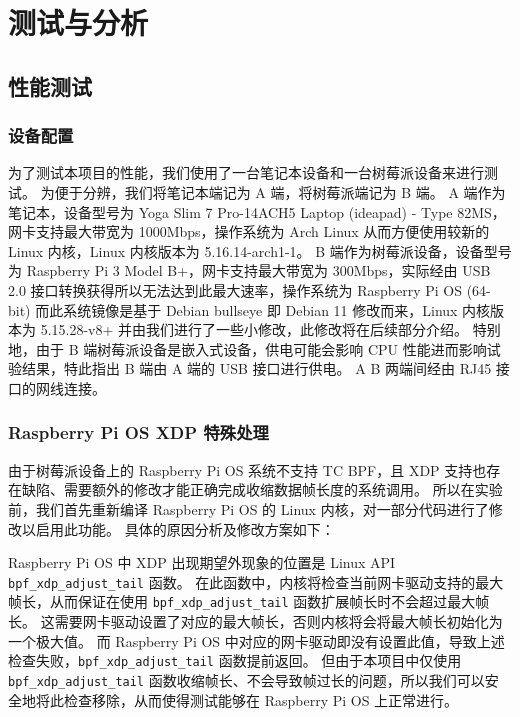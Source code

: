 

\chapter{测试与分析}

\section{性能测试}

\subsection{设备配置}

为了测试本项目的性能，我们使用了一台笔记本设备和一台树莓派设备来进行测试。
为便于分辨，我们将笔记本端记为 A 端，将树莓派端记为 B 端。
A 端作为笔记本，设备型号为 Yoga Slim 7 Pro-14ACH5 Laptop (ideapad) - Type 82MS，网卡支持最大带宽为 1000Mbps，操作系统为 Arch Linux 从而方便使用较新的 Linux 内核，Linux 内核版本为 5.16.14-arch1-1。
B 端作为树莓派设备，设备型号为 Raspberry Pi 3 Model B+，网卡支持最大带宽为 300Mbps，实际经由 USB 2.0 接口转换获得所以无法达到此最大速率，操作系统为 Raspberry Pi OS (64-bit) 而此系统镜像是基于 Debian bullseye 即 Debian 11 修改而来，Linux 内核版本为 5.15.28-v8+ 并由我们进行了一些小修改，此修改将在后续部分介绍。
特别地，由于 B 端树莓派设备是嵌入式设备，供电可能会影响 CPU 性能进而影响试验结果，特此指出 B 端由 A 端的 USB 接口进行供电。
A B 两端间经由 RJ45 接口的网线连接。

\subsection{Raspberry Pi OS XDP 特殊处理}

由于树莓派设备上的 Raspberry Pi OS 系统不支持 TC BPF，且 XDP 支持也存在缺陷、需要额外的修改才能正确完成收缩数据帧长度的系统调用。
所以在实验前，我们首先重新编译 Raspberry Pi OS 的 Linux 内核，对一部分代码进行了修改以启用此功能。
具体的原因分析及修改方案如下：

Raspberry Pi OS 中 XDP 出现期望外现象的位置是 Linux API \texttt{bpf\_xdp\_adjust\_tail} 函数。
在此函数中，内核将检查当前网卡驱动支持的最大帧长，从而保证在使用 \texttt{bpf\_xdp\_adjust\_tail} 函数扩展帧长时不会超过最大帧长。
这需要网卡驱动设置了对应的最大帧长，否则内核将会将最大帧长初始化为一个极大值。
而 Raspberry Pi OS 中对应的网卡驱动即没有设置此值，导致上述检查失败，\texttt{bpf\_xdp\_adjust\_tail} 函数提前返回。
但由于本项目中仅使用 \texttt{bpf\_xdp\_adjust\_tail} 函数收缩帧长、不会导致帧过长的问题，所以我们可以安全地将此检查移除，从而使得测试能够在 Raspberry Pi OS 上正常进行。

